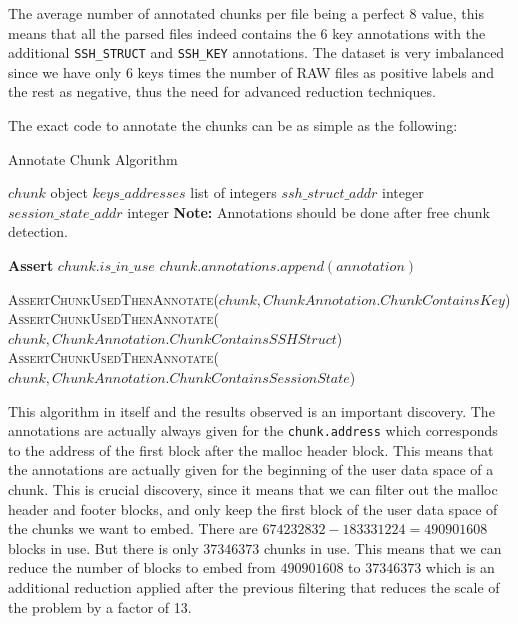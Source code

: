     The average number of annotated chunks per file being a perfect 8 value, this means that all the parsed files indeed contains the 6 key annotations with the additional \texttt{SSH\_STRUCT} and \texttt{SSH\_KEY} annotations. The dataset is very imbalanced since we have only 6 keys times the number of RAW files as positive labels and the rest as negative, thus the need for advanced reduction techniques. 
    
    The exact code to annotate the chunks can be as simple as the following:

    \begin{algorithm}[H]
        \caption{Annotate Chunk Algorithm}
        \begin{algorithmic}[1]
            \Ensure $chunk$ object
            \Ensure $keys\_addresses$ list of integers
            \Ensure $ssh\_struct\_addr$ integer
            \Ensure $session\_state\_addr$ integer
            \State \textbf{Note:} Annotations should be done after free chunk detection.
            
                \State \textbf{Assert} $chunk.is\_in\_use$ 
                \State $chunk.annotations.append(annotation)$
            \EndProcedure
            
                \State \textsc{AssertChunkUsedThenAnnotate}($chunk, ChunkAnnotation.ChunkContainsKey$)
                \State \textsc{AssertChunkUsedThenAnnotate}($chunk, ChunkAnnotation.ChunkContainsSSHStruct$)
                \State \textsc{AssertChunkUsedThenAnnotate}($chunk, ChunkAnnotation.ChunkContainsSessionState$)
            \EndIf
        \EndProcedure
        \end{algorithmic}
    \end{algorithm}
    
    This algorithm in itself and the results observed is an important discovery. The annotations are actually always given for the \texttt{chunk.address} which corresponds to the address of the first block after the malloc header block. This means that the annotations are actually given for the beginning of the user data space of a chunk. This is crucial discovery, since it means that we can filter out the malloc header and footer blocks, and only keep the first block of the user data space of the chunks we want to embed. There are $674232832 - 183331224 = 490901608$ blocks in use. But there is only $37346373$ chunks in use. This means that we can reduce the number of blocks to embed from $490901608$ to $37346373$ which is an additional reduction applied after the previous filtering that reduces the scale of the problem by a factor of 13. 
    
